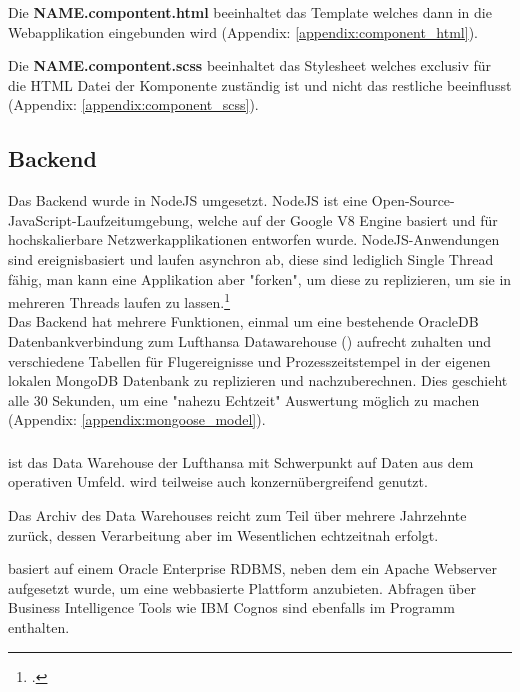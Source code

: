 	{
		\noindent
		Die \textbf{NAME.compontent.html} beeinhaltet das  Template welches dann in die Webapplikation eingebunden wird (Appendix: \ref{appendix:component_html}).
	}
	\vspace{10pt}

	{
		\noindent
		Die \textbf{NAME.compontent.scss} beeinhaltet das  Stylesheet welches exclusiv für die HTML Datei der Komponente zuständig ist und nicht das restliche  beeinflusst (Appendix: \ref{appendix:component_scss}).
	}
	

	

	\subsection{Backend}
	Das Backend wurde in NodeJS umgesetzt. NodeJS ist eine Open-Source-JavaScript-Laufzeitumgebung, welche auf der Google V8 Engine basiert und für hochskalierbare Netzwerkapplikationen entworfen wurde. NodeJS-Anwendungen sind ereignisbasiert und laufen asynchron ab, diese sind lediglich Single Thread fähig, man kann eine Applikation aber "forken", um diese zu replizieren, um sie in mehreren Threads laufen zu lassen.\footcite{4}\\
	Das Backend hat mehrere Funktionen, einmal um eine bestehende OracleDB Datenbankverbindung zum Lufthansa Datawarehouse () aufrecht zuhalten und verschiedene Tabellen für Flugereignisse und Prozesszeitstempel in der eigenen lokalen MongoDB Datenbank zu replizieren und nachzuberechnen. Dies geschieht alle 30 Sekunden, um eine "nahezu Echtzeit" Auswertung möglich zu machen (Appendix: \ref{appendix:mongoose_model}).



	\subsubsection{}

	{
		\noindent
		 ist das Data Warehouse der Lufthansa mit Schwerpunkt auf Daten aus dem operativen Umfeld.  wird teilweise auch konzernübergreifend genutzt.
	}

	{
		\noindent
		Das Archiv des Data Warehouses reicht zum Teil über mehrere Jahrzehnte zurück, dessen Verarbeitung aber im Wesentlichen echtzeitnah erfolgt.
	}

	{
		\noindent
		 basiert auf einem Oracle Enterprise RDBMS, neben dem ein Apache Webserver aufgesetzt wurde, um eine webbasierte Plattform anzubieten. Abfragen über Business Intelligence Tools wie IBM Cognos sind ebenfalls im Programm enthalten.
	}

